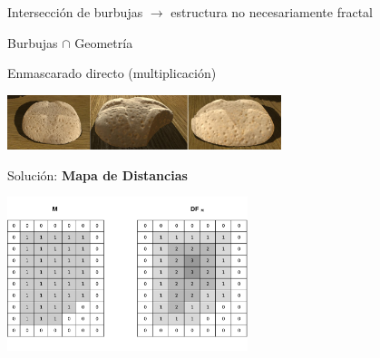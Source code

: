 \documentclass[spanish,unknownkeysallowed]{beamer}
\begin{document}
\begin{frame}
Intersección de burbujas $\rightarrow$ estructura no necesariamente fractal


\centering
Burbujas $\cap$ Geometría

Enmascarado directo (multiplicación)

\centerline{\includegraphics[width=8cm]{../figures/intersectProblem}}








Solución: \textbf{Mapa de Distancias}
\centerline{\includegraphics[width=7cm]{../figures/DistanceTransform}}

\end{frame}
\end{document}
